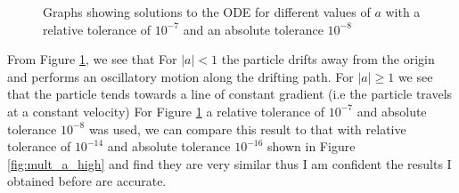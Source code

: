 \documentclass[11pt]{article} %
\begin{document}
\begin{figure}[h]
\begin{subfigure}{0.5\textwidth}
	\end{subfigure}
	\caption{Graphs showing solutions to the ODE for different values of $a$ with a relative tolerance of $10^{-7}$ and an absolute tolerance $10^{-8}$}
	\label{fig:mult_a}
\end{figure}
From Figure \ref{fig:mult_a}, we see that For $|a|<1$ the particle drifts away from the origin and performs an oscillatory motion along the drifting path. For $|a| \geq 1$ we see that the particle tends towards a line of constant gradient (i.e the particle travels at a constant velocity) For Figure \ref{fig:mult_a} a relative tolerance of $10^{-7}$ and absolute tolerance $10^{-8}$ was used, we can compare this result to that with relative tolerance of $10^{-14}$ and absolute tolerance $10^{-16}$ shown in Figure \ref{fig:mult_a_high} and find they are very similar thus I am confident the results I obtained before are accurate.
\end{document}
